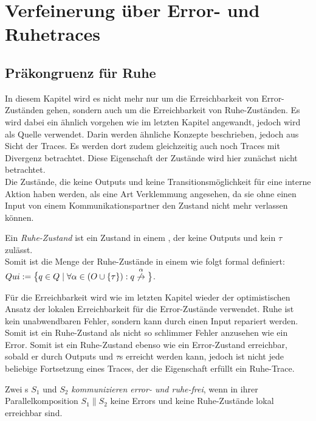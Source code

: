 \chapter{Verfeinerung über Error- und Ruhetraces}

\section{Präkongruenz für Ruhe}

In diesem Kapitel wird es nicht mehr nur um die Erreichbarkeit von
Error-Zuständen gehen, sondern auch um die Erreichbarkeit von
Ruhe-Zuständen. Es wird dabei ein ähnlich vorgehen wie im letzten Kapitel
angewandt, jedoch wird~\cite{Chilton2013} als Quelle verwendet. Darin werden ähnliche
Konzepte beschrieben, jedoch aus Sicht der Traces. Es werden dort zudem
gleichzeitig auch noch Traces mit Divergenz betrachtet. Diese Eigenschaft der
Zustände wird hier zunächst nicht betrachtet.\\
Die Zustände, die keine Outputs und keine Transitionsmöglichkeit für
eine interne Aktion haben werden, als eine Art Verklemmung angesehen, da sie
ohne einen Input von einem Kommunikationspartner den Zustand nicht mehr
verlassen können.

\begin{Def}[Ruhe]
  Ein \emph{Ruhe-Zustand} ist ein Zustand in einem \EIO{}, der keine
  Outputs und kein $\tau$ zulässt.\\
  Somit ist die Menge der Ruhe-Zustände in einem \EIO{} wie folgt formal
  definiert: $Qui:=\big\{q\in Q\mid \forall \alpha\in (O\cup \{\tau\}): q
  \overset{\alpha}{\not{\hspace{-0.1cm}\rightarrow}}\big\}$.
\end{Def}

Für die Erreichbarkeit wird wie im letzten Kapitel wieder der
optimistischen Ansatz der lokalen Erreichbarkeit für die Error-Zustände
verwendet. Ruhe ist kein unabwendbaren Fehler, sondern kann durch einen Input
repariert werden. Somit ist ein Ruhe-Zustand als nicht so \glqq{}schlimmer
Fehler\grqq{} anzusehen wie ein Error. Somit ist ein Ruhe-Zustand ebenso wie
ein Error-Zustand erreichbar, sobald er durch Outputs und $\tau$s erreicht
werden kann, jedoch ist nicht jede beliebige Fortsetzung eines Traces, der die
Eigenschaft erfüllt ein Ruhe-Trace.

\begin{Def}
  Zwei \EIO{}s $S_1$ und $S_2$ \emph{kommunizieren error- und ruhe-frei}, wenn
  in ihrer Parallelkomposition $S_1\| S_2$ keine Errors und keine Ruhe-Zustände
  lokal erreichbar sind.
\end{Def}

